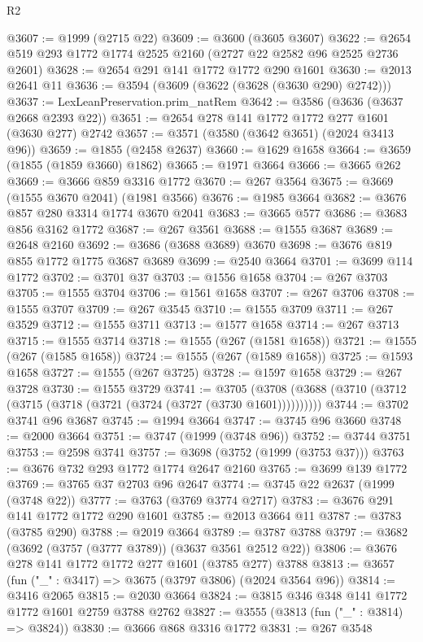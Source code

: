 \begin{lexlean}{R2}
\begin{coremodule}
@3607 := @1999 (@2715 @22)
@3609 := @3600 (@3605 @3607)
@3622 := @2654 @519 @293 @1772 @1774 @2525 @2160 (@2727 @22 @2582 @96 @2525 @2736 @2601)
@3628 := @2654 @291 @141 @1772 @1772 @290 @1601
@3630 := @2013 @2641 @11
@3636 := @3594 (@3609 (@3622 (@3628 (@3630 @290) @2742)))
@3637 := LexLeanPreservation.prim_natRem
@3642 := @3586 (@3636 (@3637 @2668 @2393 @22))
@3651 := @2654 @278 @141 @1772 @1772 @277 @1601 (@3630 @277) @2742
@3657 := @3571 (@3580 (@3642 @3651) (@2024 @3413 @96))
@3659 := @1855 (@2458 @2637)
@3660 := @1629 @1658
@3664 := @3659 (@1855 (@1859 @3660) @1862)
@3665 := @1971 @3664
@3666 := @3665 @262
@3669 := @3666 @859 @3316 @1772
@3670 := @267 @3564
@3675 := @3669 (@1555 @3670 @2041) (@1981 @3566)
@3676 := @1985 @3664
@3682 := @3676 @857 @280 @3314 @1774 @3670 @2041
@3683 := @3665 @577
@3686 := @3683 @856 @3162 @1772
@3687 := @267 @3561
@3688 := @1555 @3687
@3689 := @2648 @2160
@3692 := @3686 (@3688 @3689) @3670
@3698 := @3676 @819 @855 @1772 @1775 @3687 @3689
@3699 := @2540 @3664
@3701 := @3699 @114 @1772
@3702 := @3701 @37
@3703 := @1556 @1658
@3704 := @267 @3703
@3705 := @1555 @3704
@3706 := @1561 @1658
@3707 := @267 @3706
@3708 := @1555 @3707
@3709 := @267 @3545
@3710 := @1555 @3709
@3711 := @267 @3529
@3712 := @1555 @3711
@3713 := @1577 @1658
@3714 := @267 @3713
@3715 := @1555 @3714
@3718 := @1555 (@267 (@1581 @1658))
@3721 := @1555 (@267 (@1585 @1658))
@3724 := @1555 (@267 (@1589 @1658))
@3725 := @1593 @1658
@3727 := @1555 (@267 @3725)
@3728 := @1597 @1658
@3729 := @267 @3728
@3730 := @1555 @3729
@3741 := @3705 (@3708 (@3688 (@3710 (@3712 (@3715 (@3718 (@3721 (@3724 (@3727 (@3730 @1601))))))))))
@3744 := @3702 @3741 @96 @3687
@3745 := @1994 @3664
@3747 := @3745 @96 @3660
@3748 := @2000 @3664
@3751 := @3747 (@1999 (@3748 @96))
@3752 := @3744 @3751
@3753 := @2598 @3741
@3757 := @3698 (@3752 (@1999 (@3753 @37)))
@3763 := @3676 @732 @293 @1772 @1774 @2647 @2160
@3765 := @3699 @139 @1772
@3769 := @3765 @37 @2703 @96 @2647
@3774 := @3745 @22 @2637 (@1999 (@3748 @22))
@3777 := @3763 (@3769 @3774 @2717)
@3783 := @3676 @291 @141 @1772 @1772 @290 @1601
@3785 := @2013 @3664 @11
@3787 := @3783 (@3785 @290)
@3788 := @2019 @3664
@3789 := @3787 @3788
@3797 := @3682 (@3692 (@3757 (@3777 @3789)) (@3637 @3561 @2512 @22))
@3806 := @3676 @278 @141 @1772 @1772 @277 @1601 (@3785 @277) @3788
@3813 := @3657 (fun ("_" : @3417) => @3675 (@3797 @3806) (@2024 @3564 @96))
@3814 := @3416 @2065
@3815 := @2030 @3664
@3824 := @3815 @346 @348 @141 @1772 @1772 @1601 @2759 @3788 @2762
@3827 := @3555 (@3813 (fun ("_" : @3814) => @3824))
@3830 := @3666 @868 @3316 @1772
@3831 := @267 @3548

\end{coremodule}
\end{lexlean}
